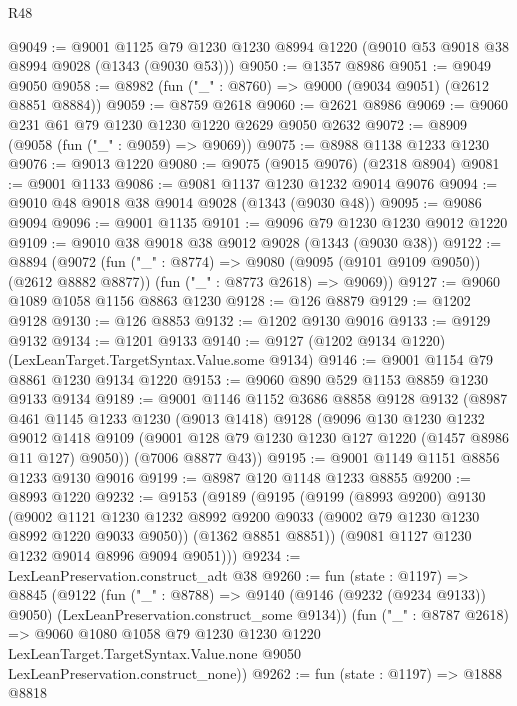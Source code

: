 \begin{lexlean}{R48}
\begin{coremodule}
@9049 := @9001
    @1125
    @79
    @1230
    @1230
    @8994
    @1220
    (@9010 @53 @9018 @38 @8994 @9028 (@1343 (@9030 @53)))
@9050 := @1357 @8986
@9051 := @9049 @9050
@9058 := @8982 (fun ("_" : @8760) => @9000 (@9034 @9051) (@2612 @8851 @8884))
@9059 := @8759 @2618
@9060 := @2621 @8986
@9069 := @9060 @231 @61 @79 @1230 @1230 @1220 @2629 @9050 @2632
@9072 := @8909 (@9058 (fun ("_" : @9059) => @9069))
@9075 := @8988 @1138 @1233 @1230
@9076 := @9013 @1220
@9080 := @9075 (@9015 @9076) (@2318 @8904)
@9081 := @9001 @1133
@9086 := @9081 @1137 @1230 @1232 @9014 @9076
@9094 := @9010 @48 @9018 @38 @9014 @9028 (@1343 (@9030 @48))
@9095 := @9086 @9094
@9096 := @9001 @1135
@9101 := @9096 @79 @1230 @1230 @9012 @1220
@9109 := @9010 @38 @9018 @38 @9012 @9028 (@1343 (@9030 @38))
@9122 := @8894
    (@9072
      (fun ("_" : @8774) => @9080 (@9095 (@9101 @9109 @9050)) (@2612 @8882 @8877))
      (fun ("_" : @8773 @2618) => @9069))
@9127 := @9060 @1089 @1058 @1156 @8863 @1230
@9128 := @126 @8879
@9129 := @1202 @9128
@9130 := @126 @8853
@9132 := @1202 @9130 @9016
@9133 := @9129 @9132
@9134 := @1201 @9133
@9140 := @9127 (@1202 @9134 @1220) (LexLeanTarget.TargetSyntax.Value.some @9134)
@9146 := @9001 @1154 @79 @8861 @1230 @9134 @1220
@9153 := @9060 @890 @529 @1153 @8859 @1230 @9133 @9134
@9189 := @9001
    @1146
    @1152
    @3686
    @8858
    @9128
    @9132
    (@8987
      @461
      @1145
      @1233
      @1230
      (@9013 @1418)
      @9128
      (@9096
        @130
        @1230
        @1232
        @9012
        @1418
        @9109
        (@9001 @128 @79 @1230 @1230 @127 @1220 (@1457 @8986 @11 @127) @9050))
      (@7006 @8877 @43))
@9195 := @9001 @1149 @1151 @8856 @1233 @9130 @9016
@9199 := @8987 @120 @1148 @1233 @8855
@9200 := @8993 @1220
@9232 := @9153
    (@9189
      (@9195
        (@9199
          (@8993 @9200)
          @9130
          (@9002
            @1121
            @1230
            @1232
            @8992
            @9200
            @9033
            (@9002 @79 @1230 @1230 @8992 @1220 @9033 @9050))
          (@1362 @8851 @8851))
        (@9081 @1127 @1230 @1232 @9014 @8996 @9094 @9051)))
@9234 := LexLeanPreservation.construct_adt @38
@9260 := fun (state : @1197) =>
  @8845
    (@9122
      (fun ("_" : @8788) =>
      @9140 (@9146 (@9232 (@9234 @9133)) @9050) (LexLeanPreservation.construct_some @9134))
      (fun ("_" : @8787 @2618) =>
      @9060
        @1080
        @1058
        @79
        @1230
        @1230
        @1220
        LexLeanTarget.TargetSyntax.Value.none
        @9050
        LexLeanPreservation.construct_none))
@9262 := fun (state : @1197) => @1888 @8818

\end{coremodule}
\end{lexlean}
